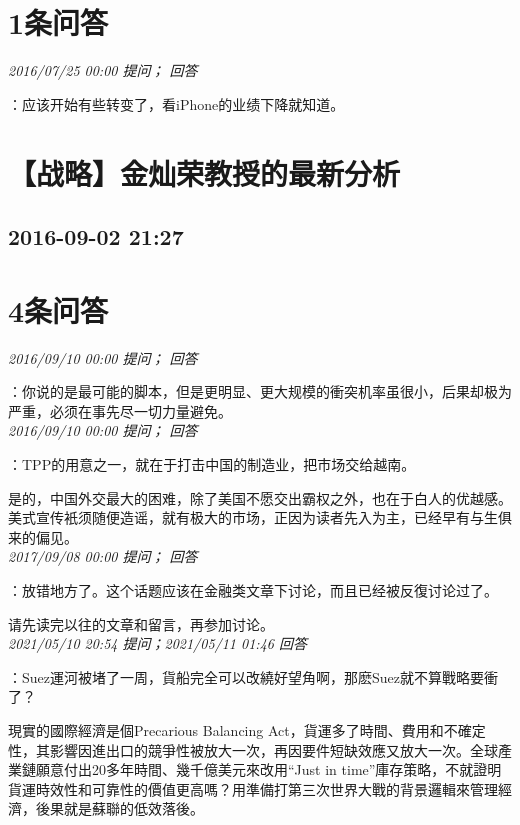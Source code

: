 \documentclass[twocolumn]{ctexart}
\begin{document}
\section{1条问答}

\textit{\hfill\noindent\small 2016/07/25 00:00 提问； 回答}

：应该开始有些转变了，看iPhone的业绩下降就知道。\\


\section{【战略】金灿荣教授的最新分析}
\subsection{2016-09-02 21:27}


\section{4条问答}

\textit{\hfill\noindent\small 2016/09/10 00:00 提问； 回答}

：你说的是最可能的脚本，但是更明显、更大规模的衝突机率虽很小，后果却极为严重，必须在事先尽一切力量避免。\\

\textit{\hfill\noindent\small 2016/09/10 00:00 提问； 回答}

：TPP的用意之一，就在于打击中国的制造业，把市场交给越南。

是的，中国外交最大的困难，除了美国不愿交出霸权之外，也在于白人的优越感。美式宣传衹须随便造谣，就有极大的市场，正因为读者先入为主，已经早有与生俱来的偏见。\\

\textit{\hfill\noindent\small 2017/09/08 00:00 提问； 回答}

：放错地方了。这个话题应该在金融类文章下讨论，而且已经被反復讨论过了。

请先读完以往的文章和留言，再参加讨论。\\

\textit{\hfill\noindent\small 2021/05/10 20:54 提问；2021/05/11 01:46 回答}

：Suez運河被堵了一周，貨船完全可以改繞好望角啊，那麽Suez就不算戰略要衝了？

現實的國際經濟是個Precarious Balancing Act，貨運多了時間、費用和不確定性，其影響因進出口的競爭性被放大一次，再因要件短缺效應又放大一次。全球產業鏈願意付出20多年時間、幾千億美元來改用“Just in time”庫存策略，不就證明貨運時效性和可靠性的價值更高嗎？用準備打第三次世界大戰的背景邏輯來管理經濟，後果就是蘇聯的低效落後。
\\
\end{document}
